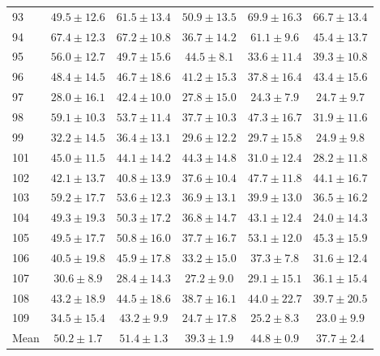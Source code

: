 \begin{tabular}{lccccc}
93 & $49.5 \pm 12.6$ & $61.5 \pm 13.4$ & $50.9 \pm 13.5$ & $\mathbf{69.9} \pm 16.3$ & $66.7 \pm 13.4$ \\
94 & $\mathbf{67.4} \pm 12.3$ & $67.2 \pm 10.8$ & $36.7 \pm 14.2$ & $61.1 \pm 9.6$ & $45.4 \pm 13.7$ \\
95 & $\mathbf{56.0} \pm 12.7$ & $49.7 \pm 15.6$ & $44.5 \pm 8.1$ & $33.6 \pm 11.4$ & $39.3 \pm 10.8$ \\
96 & $\mathbf{48.4} \pm 14.5$ & $46.7 \pm 18.6$ & $41.2 \pm 15.3$ & $37.8 \pm 16.4$ & $43.4 \pm 15.6$ \\
97 & $28.0 \pm 16.1$ & $\mathbf{42.4} \pm 10.0$ & $27.8 \pm 15.0$ & $24.3 \pm 7.9$ & $24.7 \pm 9.7$ \\
98 & $\mathbf{59.1} \pm 10.3$ & $53.7 \pm 11.4$ & $37.7 \pm 10.3$ & $47.3 \pm 16.7$ & $31.9 \pm 11.6$ \\
99 & $32.2 \pm 14.5$ & $\mathbf{36.4} \pm 13.1$ & $29.6 \pm 12.2$ & $29.7 \pm 15.8$ & $24.9 \pm 9.8$ \\
101 & $\mathbf{45.0} \pm 11.5$ & $44.1 \pm 14.2$ & $44.3 \pm 14.8$ & $31.0 \pm 12.4$ & $28.2 \pm 11.8$ \\
102 & $42.1 \pm 13.7$ & $40.8 \pm 13.9$ & $37.6 \pm 10.4$ & $\mathbf{47.7} \pm 11.8$ & $44.1 \pm 16.7$ \\
103 & $\mathbf{59.2} \pm 17.7$ & $53.6 \pm 12.3$ & $36.9 \pm 13.1$ & $39.9 \pm 13.0$ & $36.5 \pm 16.2$ \\
104 & $49.3 \pm 19.3$ & $\mathbf{50.3} \pm 17.2$ & $36.8 \pm 14.7$ & $43.1 \pm 12.4$ & $24.0 \pm 14.3$ \\
105 & $49.5 \pm 17.7$ & $50.8 \pm 16.0$ & $37.7 \pm 16.7$ & $\mathbf{53.1} \pm 12.0$ & $45.3 \pm 15.9$ \\
106 & $40.5 \pm 19.8$ & $\mathbf{45.9} \pm 17.8$ & $33.2 \pm 15.0$ & $37.3 \pm 7.8$ & $31.6 \pm 12.4$ \\
107 & $30.6 \pm 8.9$ & $28.4 \pm 14.3$ & $27.2 \pm 9.0$ & $29.1 \pm 15.1$ & $\mathbf{36.1} \pm 15.4$ \\
108 & $43.2 \pm 18.9$ & $\mathbf{44.5} \pm 18.6$ & $38.7 \pm 16.1$ & $44.0 \pm 22.7$ & $39.7 \pm 20.5$ \\
109 & $34.5 \pm 15.4$ & $\mathbf{43.2} \pm 9.9$ & $24.7 \pm 17.8$ & $25.2 \pm 8.3$ & $23.0 \pm 9.9$ \\
\midrule
Mean & $50.2 \pm 1.7$ & $\mathbf{51.4} \pm 1.3$ & $39.3 \pm 1.9$ & $44.8 \pm 0.9$ & $37.7 \pm 2.4$ \\
\bottomrule
\end{tabular}
